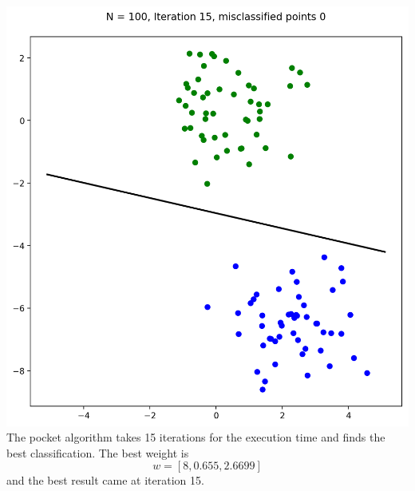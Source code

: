 \documentclass[10pt]{article}         %
\begin{document}
\includegraphics[scale=0.45]{Blob_PLA_N100_it15}
\\The pocket algorithm takes 15 iterations for the execution time and finds the best classification. The best weight is $$w = [8,  0.655, 2.6699]$$ and the best result came at iteration 15.
\end{document}
